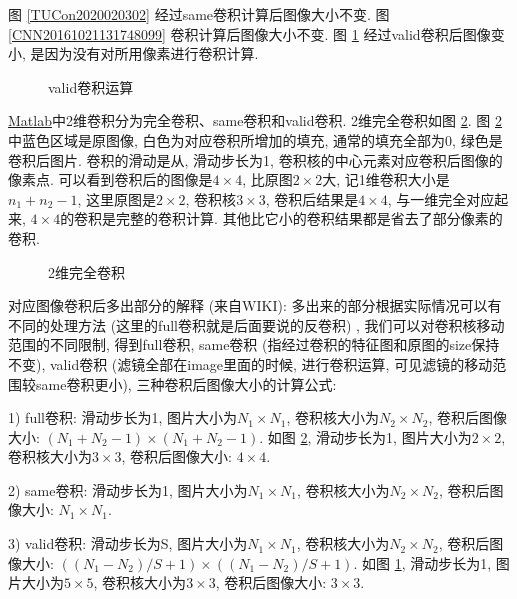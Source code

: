 图 \ref{TUCon2020020302} 经过same卷积计算后图像大小不变.
图 \ref{CNN20161021131748099} 卷积计算后图像大小不变.
图 \ref{20161021135241205} 经过valid卷积后图像变小, 是因为没有对所用像素进行卷积计算.
\begin{figure}[H]
\centering
{}
\caption{valid卷积运算}
\label{20161021135241205}
\end{figure}

\href{https://cn.mathworks.com/help/matlab/ref/conv2.html?requestedDomain=www.mathworks.com}{Matlab}中2维卷积分为完全卷积、same卷积和valid卷积.
2维完全卷积如图 \ref{CNN20161021141659634}.
图 \ref{CNN20161021141659634} 中蓝色区域是原图像, 白色为对应卷积所增加的填充, 通常的填充全部为0, 绿色是卷积后图片.
卷积的滑动是从, 滑动步长为1, 卷积核的中心元素对应卷积后图像的像素点.
可以看到卷积后的图像是$4\times 4$, 比原图$2\times 2$大, 记1维卷积大小是$n_1+n_2-1$, 这里原图是$2\times 2$, 卷积核$3\times 3$, 卷积后结果是$4\times 4$, 与一维完全对应起来,
$4\times 4$的卷积是完整的卷积计算. 其他比它小的卷积结果都是省去了部分像素的卷积.
\begin{figure}[H]
\centering
{}
\caption{2维完全卷积}
\label{CNN20161021141659634}
\end{figure}
对应图像卷积后多出部分的解释 (来自WIKI): 多出来的部分根据实际情况可以有不同的处理方法 (这里的full卷积就是后面要说的反卷积) ,
我们可以对卷积核移动范围的不同限制, 得到full卷积, same卷积 (指经过卷积的特征图和原图的size保持不变), valid卷积 (滤镜全部在image里面的时候, 进行卷积运算, 可见滤镜的移动范围较same卷积更小), 三种卷积后图像大小的计算公式:

1) full卷积: 滑动步长为1, 图片大小为$N_1\times N_1$, 卷积核大小为$N_2\times N_2$, 卷积后图像大小: $ (N_1+N_2-1) \times (N_1+N_2-1)$.
如图 \ref{CNN20161021141659634}, 滑动步长为1, 图片大小为$2\times 2$, 卷积核大小为$3\times 3$, 卷积后图像大小: $4\times 4$.

2) same卷积: 滑动步长为1, 图片大小为$N_1\times N_1$, 卷积核大小为$N_2\times N_2$, 卷积后图像大小: $N_1\times N_1$.

3) valid卷积: 滑动步长为S, 图片大小为$N_1\times N_1$, 卷积核大小为$N_2\times N_2$, 卷积后图像大小: $ ( (N_1-N_2)/S+1) \times ( (N_1-N_2)/S+1)$.
如图 \ref{20161021135241205}, 滑动步长为1, 图片大小为$5\times 5$, 卷积核大小为$3\times 3$, 卷积后图像大小: $3\times 3$.

